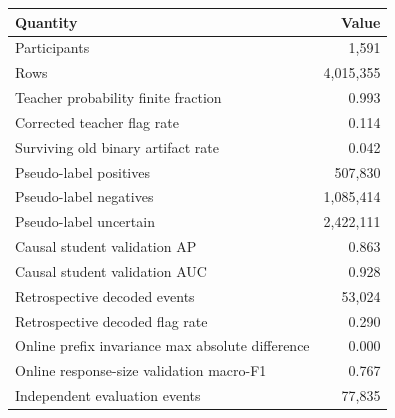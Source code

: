 \begin{tabular}{lr}
\toprule
Quantity & Value \\
\midrule
Participants & 1,591 \\
Rows & 4,015,355 \\
Teacher probability finite fraction & 0.993 \\
Corrected teacher flag rate & 0.114 \\
Surviving old binary artifact rate & 0.042 \\
Pseudo-label positives & 507,830 \\
Pseudo-label negatives & 1,085,414 \\
Pseudo-label uncertain & 2,422,111 \\
Causal student validation AP & 0.863 \\
Causal student validation AUC & 0.928 \\
Retrospective decoded events & 53,024 \\
Retrospective decoded flag rate & 0.290 \\
Online prefix invariance max absolute difference & 0.000 \\
Online response-size validation macro-F1 & 0.767 \\
Independent evaluation events & 77,835 \\
\bottomrule
\end{tabular}
